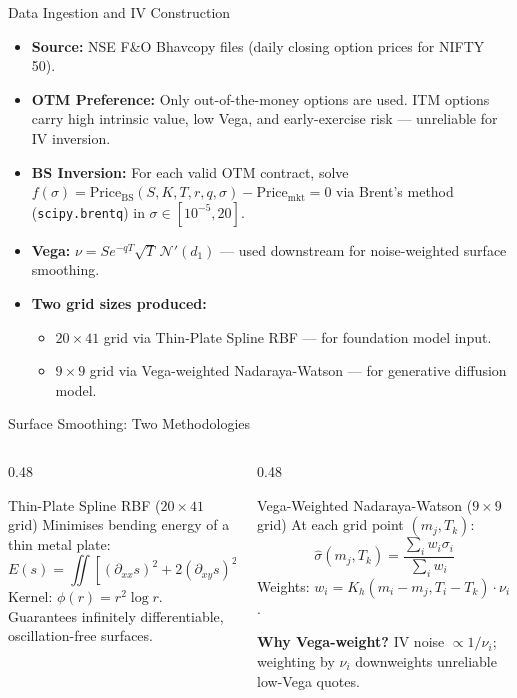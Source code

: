 \documentclass[aspectratio=169,10pt]{beamer}
\begin{document}
\begin{frame}{Data Ingestion and IV Construction}
  \begin{itemize}\itemsep5pt
    \item \textbf{Source:} NSE F\&O Bhavcopy files (daily closing option prices for NIFTY 50).
    \item \textbf{OTM Preference:} Only out-of-the-money options are used. ITM options carry high intrinsic value, low Vega, and early-exercise risk --- unreliable for IV inversion.
    \item \textbf{BS Inversion:} For each valid OTM contract, solve
      $f(\sigma)=\mathrm{Price}_\mathrm{BS}(S,K,T,r,q,\sigma)-\mathrm{Price}_\mathrm{mkt}=0$
      via Brent's method (\texttt{scipy.brentq}) in $\sigma\in[10^{-5},20]$.
    \item \textbf{Vega:} $\nu=Se^{-qT}\sqrt{T}\,\mathcal{N}'(d_1)$ --- used downstream for noise-weighted surface smoothing.
    \item \textbf{Two grid sizes produced:}
      \begin{itemize}
        \item $20\times41$ grid via Thin-Plate Spline RBF --- for foundation model input.
        \item $9\times9$ grid via Vega-weighted Nadaraya-Watson --- for generative diffusion model.
      \end{itemize}
  \end{itemize}
\end{frame}

\begin{frame}{Surface Smoothing: Two Methodologies}
  \begin{columns}[T]
    \begin{column}{0.48\textwidth}
      \begin{block}{Thin-Plate Spline RBF ($20{\times}41$ grid)}
        \footnotesize
        Minimises bending energy of a thin metal plate:
        \[
          E(s)=\iint\!\left[(\partial_{xx}s)^2+2(\partial_{xy}s)^2+(\partial_{yy}s)^2\right]dx\,dy
        \]
        Kernel: $\phi(r)=r^2\log r$.
        Guarantees infinitely differentiable, oscillation-free surfaces.
      \end{block}
    \end{column}
    \begin{column}{0.48\textwidth}
      \begin{block}{Vega-Weighted Nadaraya-Watson ($9{\times}9$ grid)}
        \footnotesize
        At each grid point $(m_j,T_k)$:
        \[
          \hat{\sigma}(m_j,T_k)=\frac{\sum_i w_i\sigma_i}{\sum_i w_i}
        \]
        Weights: $w_i=K_h(m_i\!-\!m_j,T_i\!-\!T_k)\cdot\nu_i$.

        \textbf{Why Vega-weight?} IV noise $\propto 1/\nu_i$; weighting by $\nu_i$ downweights unreliable low-Vega quotes.
      \end{block}
    \end{column}
  \end{columns}
\end{frame}
\end{document}
